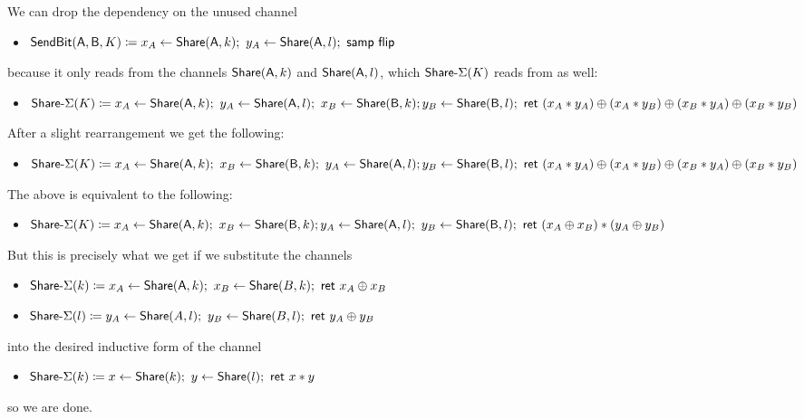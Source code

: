 \begin{itemize}
\begin{itemize}
\end{itemize}
We can drop the dependency on the unused channel
\begin{itemize}
\item $\SendBit(\A,\B,K) \coloneqq x_A \leftarrow \Share(\A,k); \ y_A \leftarrow \Share(\A,l); \ \samp{\flip}$
\end{itemize}
because it only reads from the channels $\mathsf{Share}(\mathsf{A},k)$ and $\mathsf{Share}(\mathsf{A},l)$, which $\mathsf{Share}\textsf{-}\Sigma(K)$ reads from as well:
\begin{itemize}
\item $\mathsf{Share}\textsf{-}\Sigma(K) \coloneqq x_A \leftarrow \mathsf{Share}(\mathsf{A},k); \ y_A \leftarrow \mathsf{Share}(\mathsf{A},l); \ x_B \leftarrow \mathsf{Share}(\mathsf{B},k); \\ y_B \leftarrow \mathsf{Share}(\mathsf{B},l); \ \mathsf{ret} \ (x_A * y_A) \oplus (x_A * y_B) \oplus (x_B * y_A) \oplus (x_B * y_B)$
\end{itemize}
After a slight rearrangement we get the following:
\begin{itemize}
\item $\mathsf{Share}\textsf{-}\Sigma(K) \coloneqq x_A \leftarrow \mathsf{Share}(\mathsf{A},k); \ x_B \leftarrow \mathsf{Share}(\mathsf{B},k); \ y_A \leftarrow \mathsf{Share}(\mathsf{A},l); \\ y_B \leftarrow \mathsf{Share}(\mathsf{B},l); \ \mathsf{ret} \ (x_A * y_A) \oplus (x_A * y_B) \oplus (x_B * y_A) \oplus (x_B * y_B)$
\end{itemize}
The above is equivalent to the following:
\begin{itemize}
\item $\mathsf{Share}\textsf{-}\Sigma(K) \coloneqq x_A \leftarrow \mathsf{Share}(\mathsf{A},k); \ x_B \leftarrow \mathsf{Share}(\mathsf{B},k); \\ y_A \leftarrow \mathsf{Share}(\mathsf{A},l); \ y_B \leftarrow \mathsf{Share}(\mathsf{B},l); \ \mathsf{ret} \ (x_A \oplus x_B) * (y_A \oplus y_B)$
\end{itemize}
But this is precisely what we get if we substitute the channels
\begin{itemize}
\item $\mathsf{Share}\textsf{-}\Sigma(k) \coloneqq x_A \leftarrow \mathsf{Share}(\mathsf{A},k); \ x_B \leftarrow \mathsf{Share}(B,k); \ \mathsf{ret} \ x_A \oplus x_B$
\item $\mathsf{Share}\textsf{-}\Sigma(l) \coloneqq y_A \leftarrow \mathsf{Share}(A,l); \ y_B \leftarrow \mathsf{Share}(B,l); \ \mathsf{ret} \ y_A \oplus y_B$
\end{itemize}
into the desired inductive form of the channel
\begin{itemize}
\item $\mathsf{Share}\textsf{-}\Sigma(k) \coloneqq x \leftarrow \mathsf{Share}(k); \ y \leftarrow \mathsf{Share}(l); \ \mathsf{ret} \ x * y$
\end{itemize}
so we are done.
\end{itemize}

